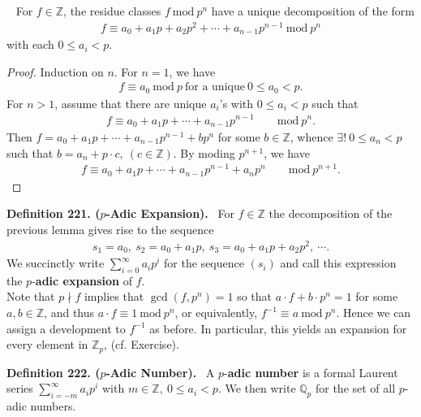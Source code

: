 \documentclass[12pt,a4paper,footinclude=true,headinclude=true]{scrbook} %
\newenvironment{lemma}[2][]
{\renewcommand\theinnercustomlemma{#2}\innercustomlemma[#1]
\begin{mdframed}[backgroundcolor=gray!20]\ }
{\end{mdframed}\endinnercustomprop}
\newenvironment{definition}[2][Definition]
    { \begin{mdframed}[backgroundcolor=gray!20] \textbf{#1 #2.}\ }
    {  \end{mdframed}}
\begin{document}
\begin{lemma}{220}
    For $f\in\mathbb{Z}$, the residue classes $f\ \mathrm{mod}\ p^n$ have a unique decomposition of the form
    \begin{align*}
        f\equiv a_0+a_1p+a_2p^2+\cdots+a_{n-1}p^{n-1}\ \mathrm{mod}\ p^n
    \end{align*}
    with each $0\leq a_i<p$.
\end{lemma}
\begin{proof}
    Induction on $n$. For $n=1$,  we have
    \begin{align*}
        f\equiv a_0\ \mathrm{mod}\ p\ \text{for a unique}\ 0\leq a_0<p.
    \end{align*}
    For $n>1$, assume that there are unique $a_i$'s with $0\leq a_i<p$ such that
    \begin{align*}
        f\equiv a_0+a_1p+\cdots+a_{n-1}p^{n-1}\qquad\mathrm{mod}\ p^n.
    \end{align*}
    Then $f=a_0+a_1p+\cdots+a_{n-1}p^{n-1}+bp^n$ for some $b\in\mathbb{Z}$, whence $\exists!\ 0\leq a_n<p$ such that $b=a_n+p\cdot c,\ (c\in\mathbb{Z})$. By moding $p^{n+1}$, we have 
    \begin{align*}
        f\equiv a_0+a_1p+\cdots+a_{n-1}p^{n-1}+a_np^n\qquad\mathrm{mod}\ p^{n+1}.
    \end{align*}
\end{proof}

\begin{definition}{221. ($p$-Adic Expansion)}
    For $f\in\mathbb{Z}$ the decomposition of the previous lemma gives rise to the sequence 
    \begin{align*}
        s_1=a_0,\ s_2=a_0+a_1p,\ s_3=a_0+a_1p+a_2p^2,\ \cdots.
    \end{align*}
    We succinctly write $\sum_{i=0}^\infty a_ip^i$ for the sequence $(s_i)$ and call this expression the $p$-\textbf{adic expansion} of $f$.\\
    Note that $p\nmid f$ implies that $\gcd{(f,p^n)}=1$ so that $a\cdot f+b\cdot p^n=1$ for some $a,b\in\mathbb{Z}$, and thus $a\cdot f\equiv1\ \mathrm{mod}\ p^n$, or equivalently, $f^{-1}\equiv a\ \mathrm{mod}\ p^n$. Hence we can assign a development to $f^{-1}$ as before. In particular, this yields an expansion for every element in $\mathbb{Z}_p$, (cf. Exercise).
\end{definition}

\begin{definition}{222. ($p$-Adic Number)}
    \newline A $p$-\textbf{adic number} is a formal Laurent series $\sum_{i=-m}^\infty a_ip^i$ with $m\in\mathbb{Z},\ 0\leq a_i<p$. We then write $\mathbb{Q}_p$ for the set of all $p$-adic numbers.
\end{definition}
\end{document}
